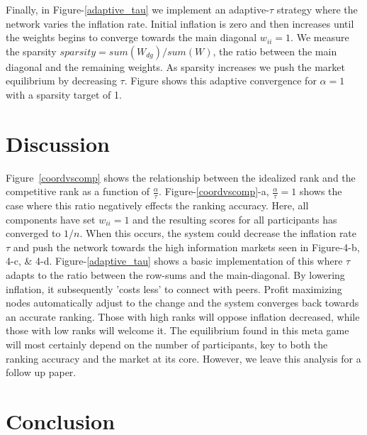 \documentclass{article}
\begin{document}
Finally, in Figure-\ref{adaptive_tau} we implement an adaptive-$\tau$ strategy where the network varies the inflation rate. Initial inflation is zero and then increases until the weights begins to converge towards the main diagonal $w_{ii}=1$. We measure the sparsity $sparsity = sum(W_{dg})/sum(W)$, the ratio between the main diagonal and the remaining weights. As sparsity increases we push the market equilibrium by decreasing $\tau$. Figure shows this adaptive convergence for $\alpha=1$ with a sparsity target of 1.
\smallskip

\section{Discussion}

Figure~\ref{coordvscomp} shows the relationship between the idealized rank and the competitive rank as a function of $\frac{\alpha}{\tau}$. Figure-\ref{coordvscomp}-a, $\frac{\alpha}{\tau} = 1$ shows the case where this ratio negatively effects the ranking accuracy. Here, all components have set $w_{ii} = 1$ and the resulting scores for all participants has converged to $1/n$. When this occurs, the system could decrease the inflation rate $\tau$ and push the network towards the high information markets seen in Figure-4-b, 4-c, \& 4-d. Figure-\ref{adaptive_tau} shows a basic implementation of this where $\tau$ adapts to the ratio between the row-sums and the main-diagonal. By lowering inflation, it subsequently 'costs less' to connect with peers. Profit maximizing nodes automatically adjust to the change and the system converges back towards an accurate ranking. Those with high ranks will oppose inflation decreased, while those with low ranks will welcome it. The equilibrium found in this meta game will most certainly depend on the number of participants, key to both the ranking accuracy and the market at its core. However, we leave this analysis for a follow up paper. 
\smallskip

\section{Conclusion}
\end{document}
